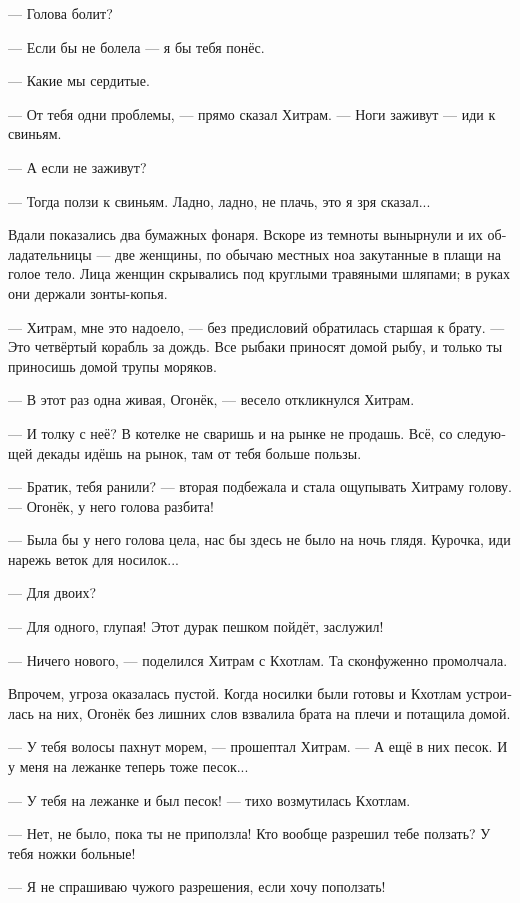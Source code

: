 \documentclass[a4paper,12pt,fleqn]{book}\usepackage{polyglossia}\setdefaultlanguage[babelshorthands=true]{russian}\setotherlanguage{english}\defaultfontfeatures{Ligatures=TeX,Mapping=tex-text}\usepackage{xcolor}\newcommand{\ml}[3]{#2}
\newcommand{\asterism}{\vspace{1em}{\centering\Large\bfseries$\ast~\ast~\ast$\par}\vspace{1em}}
\begin{document}
--- Голова болит?

--- Если бы не болела --- я бы тебя понёс.

--- Какие мы сердитые.

--- От тебя одни проблемы, --- прямо сказал Хитрам.
--- Ноги заживут --- иди к свиньям.

--- А если не заживут?

--- Тогда ползи к свиньям.
Ладно, ладно, не плачь, это я зря сказал...

Вдали показались два бумажных фонаря.
Вскоре из темноты вынырнули и их обладательницы --- две женщины, по обычаю местных ноа закутанные в плащи на голое тело.
Лица женщин скрывались под круглыми травяными шляпами;
в руках они держали зонты-копья.

--- Хитрам, мне это надоело, --- без предисловий обратилась старшая к брату.
--- Это четвёртый корабль за дождь.
Все рыбаки приносят домой рыбу, и только ты приносишь домой трупы моряков.

--- В этот раз одна живая, Огонёк, --- весело откликнулся Хитрам.

--- И толку с неё?
В котелке не сваришь и на рынке не продашь.
Всё, со следующей декады идёшь на рынок, там от тебя больше пользы.

--- Братик, тебя ранили? --- вторая подбежала и стала ощупывать Хитраму голову.
--- Огонёк, у него голова разбита!

--- Была бы у него голова цела, нас бы здесь не было на ночь глядя.
Курочка, иди нарежь веток для носилок...

--- Для двоих?

--- Для одного, глупая!
Этот дурак пешком пойдёт, заслужил!

--- Ничего нового, --- поделился Хитрам с Кхотлам.
Та сконфуженно промолчала.

Впрочем, угроза оказалась пустой.
Когда носилки были готовы и Кхотлам устроилась на них, Огонёк без лишних слов взвалила брата на плечи и потащила домой.

\asterism

--- У тебя волосы пахнут морем, --- прошептал Хитрам.
--- А ещё в них песок.
И у меня на лежанке теперь тоже песок...

--- У тебя на лежанке и был песок! --- тихо возмутилась Кхотлам.

--- Нет, не было, пока ты не приползла!
Кто вообще разрешил тебе ползать?
У тебя ножки больные!

--- Я не спрашиваю чужого разрешения, если хочу поползать!
\end{document}
